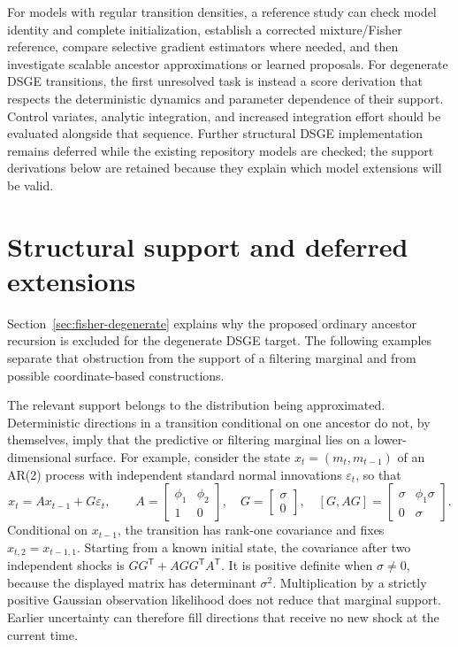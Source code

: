 \documentclass[11pt]{article}
\begin{document}
For models with regular transition densities, a reference study can check
model identity and complete initialization, establish a corrected
mixture/Fisher reference, compare selective gradient estimators where needed,
and then investigate scalable ancestor approximations or learned proposals.
For degenerate DSGE transitions, the first unresolved task is instead a
score derivation that respects the deterministic dynamics and parameter
dependence of their support. Control variates, analytic
integration, and increased integration effort should be evaluated alongside
that sequence. Further structural DSGE implementation remains deferred while
the existing repository models are checked; the support derivations below
are retained because they explain which model extensions will be valid.


\section{Structural support and deferred extensions}
\label{sec:support}

Section~\ref{sec:fisher-degenerate} explains why the proposed ordinary
ancestor recursion is excluded for the degenerate DSGE target. The following
examples separate that obstruction from the support of a filtering marginal
and from possible coordinate-based constructions.

The relevant support belongs to the distribution being approximated.
Deterministic directions in a transition conditional on one ancestor do not,
by themselves, imply that the predictive or filtering marginal lies on a
lower-dimensional surface.  For example, consider the state
$x_t=(m_t,m_{t-1})$ of an AR(2) process with independent standard normal
innovations $\varepsilon_t$, so that
\begin{equation}
 x_t=A x_{t-1}+G\varepsilon_t,\qquad
 A=\begin{bmatrix}\phi_1&\phi_2\\1&0\end{bmatrix},\quad
 G=\begin{bmatrix}\sigma\\0\end{bmatrix},\quad
 [G,AG]=\begin{bmatrix}\sigma&\phi_1\sigma\\0&\sigma\end{bmatrix}.
 \label{eq:ar2-support-distinction}
\end{equation}
Conditional on $x_{t-1}$, the transition has rank-one covariance and fixes
$x_{t,2}=x_{t-1,1}$.  Starting from a known initial state, the covariance
after two independent shocks is $GG^\mathsf{T}+AGG^\mathsf{T}A^\mathsf{T}$.
It is positive definite when $\sigma\ne0$, because the displayed matrix has
determinant $\sigma^2$.  Multiplication by a strictly positive Gaussian
observation likelihood does not reduce that marginal support.  Earlier
uncertainty can therefore fill directions that receive no new shock at the
current time.
\end{document}
